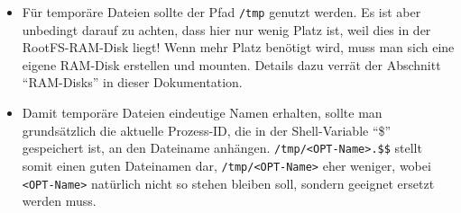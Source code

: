 \begin{itemize}
      \item Für temporäre Dateien sollte der Pfad \texttt{/tmp} genutzt werden.
        Es ist aber unbedingt darauf zu achten, dass hier nur wenig
        Platz ist, weil dies in der RootFS-RAM-Disk liegt! Wenn mehr
        Platz benötigt wird, muss man sich eine eigene RAM-Disk
        erstellen und mounten. Details dazu verrät der Abschnitt "`RAM-Disks"'
        in dieser Dokumentation.

    \item Damit temporäre Dateien eindeutige Namen erhalten, sollte man
      grundsätzlich die aktuelle Prozess-ID, die in der Shell-Variable "`\$"'
      gespeichert ist, an den Dateiname anhängen.
      \texttt{/tmp/<OPT-Name>.\$\$} stellt somit einen guten Dateinamen dar,
      \texttt{/tmp/<OPT-Name>} eher weniger, wobei \texttt{<OPT-Name>} natürlich
      nicht so stehen bleiben soll, sondern geeignet ersetzt werden muss.

\end{itemize}
